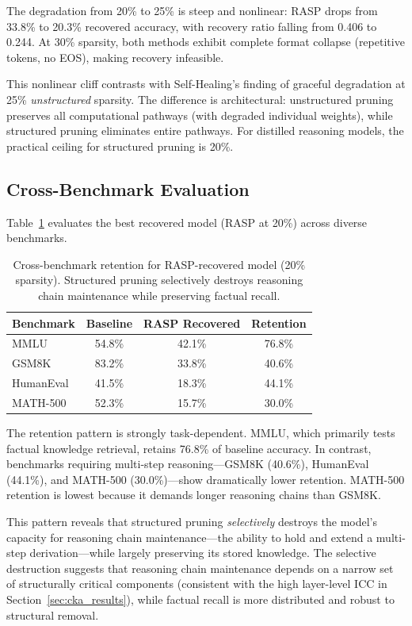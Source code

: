 \documentclass[11pt,a4paper]{article}
\begin{document}
The degradation from 20\% to 25\% is steep and nonlinear: RASP drops from 33.8\% to 20.3\% recovered accuracy, with recovery ratio falling from 0.406 to 0.244.
At 30\% sparsity, both methods exhibit complete format collapse (repetitive tokens, no EOS), making recovery infeasible.

This nonlinear cliff contrasts with Self-Healing's \cite{selfhealing2025} finding of graceful degradation at 25\% \emph{unstructured} sparsity.
The difference is architectural: unstructured pruning preserves all computational pathways (with degraded individual weights), while structured pruning eliminates entire pathways.
For distilled reasoning models, the practical ceiling for structured pruning is 20\%.

\subsection{Cross-Benchmark Evaluation}
\label{sec:crossbench}

Table~\ref{tab:crossbench} evaluates the best recovered model (RASP at 20\%) across diverse benchmarks.

\begin{table}[t]
\centering
\small
\begin{tabular}{lccc}
\toprule
\textbf{Benchmark} & \textbf{Baseline} & \textbf{RASP Recovered} & \textbf{Retention} \\
\midrule
MMLU & 54.8\% & 42.1\% & 76.8\% \\
GSM8K & 83.2\% & 33.8\% & 40.6\% \\
HumanEval & 41.5\% & 18.3\% & 44.1\% \\
MATH-500 & 52.3\% & 15.7\% & 30.0\% \\
\bottomrule
\end{tabular}
\caption{Cross-benchmark retention for RASP-recovered model (20\% sparsity). Structured pruning selectively destroys reasoning chain maintenance while preserving factual recall.}
\label{tab:crossbench}
\end{table}

The retention pattern is strongly task-dependent.
MMLU, which primarily tests factual knowledge retrieval, retains 76.8\% of baseline accuracy.
In contrast, benchmarks requiring multi-step reasoning---GSM8K (40.6\%), HumanEval (44.1\%), and MATH-500 (30.0\%)---show dramatically lower retention.
MATH-500 retention is lowest because it demands longer reasoning chains than GSM8K.

This pattern reveals that structured pruning \emph{selectively} destroys the model's capacity for reasoning chain maintenance---the ability to hold and extend a multi-step derivation---while largely preserving its stored knowledge.
The selective destruction suggests that reasoning chain maintenance depends on a narrow set of structurally critical components (consistent with the high layer-level ICC in Section~\ref{sec:cka_results}), while factual recall is more distributed and robust to structural removal.
\end{document}
